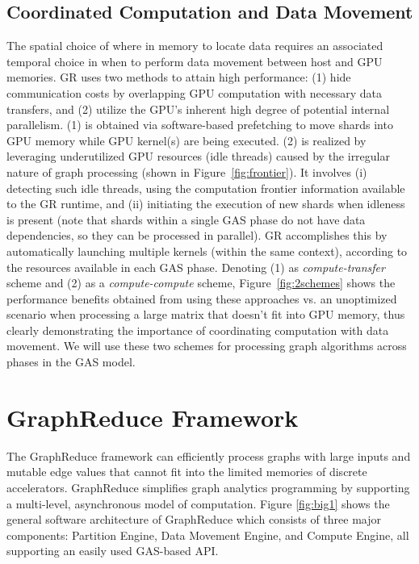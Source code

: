 \subsection{Coordinated Computation and Data Movement}

The spatial choice of where in memory to locate data requires an associated temporal choice in when to perform data movement
between host and GPU memories. GR uses two methods to attain high performance: (1) hide communication costs by overlapping 
GPU computation with necessary data transfers, and (2) utilize the GPU's inherent high degree of potential internal parallelism. 
(1) is obtained via software-based prefetching to move shards into GPU memory while GPU kernel(s) are being executed. 
(2) is realized by leveraging underutilized GPU resources (idle threads) caused by the irregular nature of graph processing (shown in Figure~\ref{fig:frontier}).
It involves (i) detecting such idle threads, using the computation frontier information available to the GR runtime, and (ii) initiating the
execution of new shards when idleness is present (note that shards within a single GAS phase do not have data dependencies, so they can
be processed in parallel). GR accomplishes this by automatically launching multiple kernels (within the same context), according to the resources
available in each GAS phase. Denoting (1) as {\em compute-transfer} scheme and (2) as a {\em compute-compute} scheme,
Figure~\ref{fig:2schemes} shows the performance benefits obtained from using these approaches vs. an unoptimized scenario when processing a large matrix that 
doesn't fit into GPU memory, thus clearly demonstrating the importance of coordinating
computation with data movement. We will use these two schemes for processing graph algorithms across phases in the GAS model. 

\section{GraphReduce Framework}
\label{Arch}




The GraphReduce framework can efficiently process graphs with large inputs and mutable edge values 
that cannot fit into the limited memories of discrete accelerators. GraphReduce simplifies graph analytics 
programming by supporting a multi-level, asynchronous model of computation. Figure \ref{fig:big1} shows the general 
software architecture of GraphReduce which consists of three major components: Partition Engine, 
Data Movement Engine, and Compute Engine, all supporting an easily used GAS-based API.


